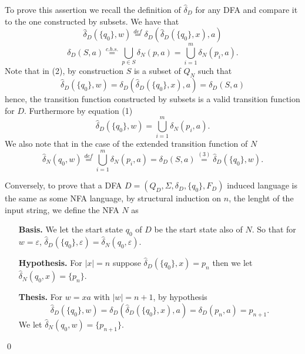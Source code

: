 \documentclass{article}
\newcommand{\D}{
    \hat{\delta}_{D}
}
\newcommand{\DD}[2]{
    \hat{\delta}_{D}(\{#1\}, #2)
}
\newcommand{\NN}[2]{
    \hat{\delta}_{N}(#1, #2)
}
\theoremstyle{remark}
\begin{document}
\begin{enumerate}
\begin{enumerate}
\[        \]
        To prove this assertion we recall the definition of $\D$ for any DFA and compare it to the one constructed by subsets.
        We have that 
        \begin{equation}
            \DD{q_0}{w} \stackrel{def}{=} \delta_D(\DD{q_0}{x},a)
        \end{equation}
        \begin{equation}
            \delta_D(S,a) \stackrel{c.b.s.}{=} \bigcup_{p \in S}\delta_N(p,a) = \bigcup_{i=1}^{m}\delta_N(p_i,a).
        \end{equation}
        Note that in (2), by construction $S$ is a subset of $Q_N$ such that
        \begin{equation}
            \DD{q_0}{w} = \delta_D(\DD{q_0}{x},a) = \delta_D(S,a)
        \end{equation}
        hence, the transition function constructed by subsets is a valid transition function for $D$.
        Furthermore by equation (1)
        \[
        \DD{q_0}{w} = \bigcup_{i=1}^{m}\delta_N(p_i,a).
        \]
        We also note that in the case of the extended transition function of $N$ 
        \[
        \NN{q_0}{w} \stackrel{def}{=} \bigcup_{i=1}^{m}\delta_N(p_i,a) = \delta_D(S,a) \stackrel{(3)}{=} \DD{q_0}{w}.
        \]
    \end{enumerate}
    
    Conversely, to prove that a DFA $D = (Q_D, \Sigma, \delta_D, \{q_0\}, F_D)$ induced language is the same as some NFA language, 
    by structural induction on $n$, the lenght of the input string, we define the NFA $N$ as 
    \begin{enumerate}
        \item[\textbf{Basis.}]
        We let the start state $q_0$ of $D$ be the start state also of $N$. 
        So that for $w = \varepsilon$, $\DD{q_0}{\varepsilon} = \NN{q_0}{\varepsilon}$.
        \item[\textbf{Hypothesis.}]
        For $\vert x \vert = n$ suppose $\DD{q_0}{x} = p_n$ then we let $\NN{q_0}{x} = \{p_n\}$.
        \item[\textbf{Thesis.}]
        For $w = xa$ with $\vert w \vert = n+1$, by hypothesis 
        \[
        \DD{q_0}{w} = \delta_D(\DD{q_0}{x},a) = \delta_D(p_n,a) = p_{n+1}.
        \]
        We let $\NN{q_0}{w} = \{p_{n+1}\}$.
    \end{enumerate}
    \begin{flushright}
        \qed
    \end{flushright}


\end{enumerate}
\end{document}
